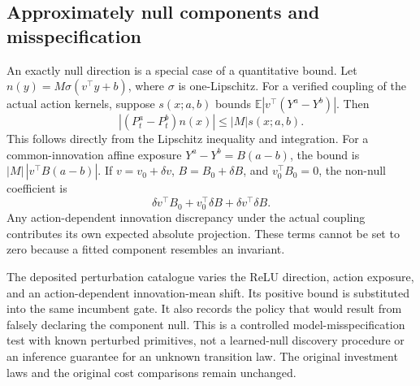 \subsection{Approximately null components and misspecification}
An exactly null direction is a special case of a quantitative bound. Let $n(y)=M\sigma(v^\top y+b)$, where $\sigma$ is one-Lipschitz. For a verified coupling of the actual action kernels, suppose $s(x;a,b)$ bounds $\mathbb E|v^\top(Y^a-Y^b)|$. Then
\begin{equation}\label{eq:approx-null54}
 |(P_t^a-P_t^b)n(x)|\le |M|s(x;a,b).
\end{equation}
This follows directly from the Lipschitz inequality and integration. For a common-innovation affine exposure $Y^a-Y^b=B(a-b)$, the bound is $|M|\,|v^\top B(a-b)|$. If $v=v_0+\delta v$, $B=B_0+\delta B$, and $v_0^\top B_0=0$, the non-null coefficient is
\[
 \delta v^\top B_0+v_0^\top\delta B+\delta v^\top\delta B.
\]
Any action-dependent innovation discrepancy under the actual coupling contributes its own expected absolute projection. These terms cannot be set to zero because a fitted component resembles an invariant.

The deposited perturbation catalogue varies the ReLU direction, action exposure, and an action-dependent innovation-mean shift. Its positive bound is substituted into the same incumbent gate. It also records the policy that would result from falsely declaring the component null. This is a controlled model-misspecification test with known perturbed primitives, not a learned-null discovery procedure or an inference guarantee for an unknown transition law. The original investment laws and the original cost comparisons remain unchanged.
